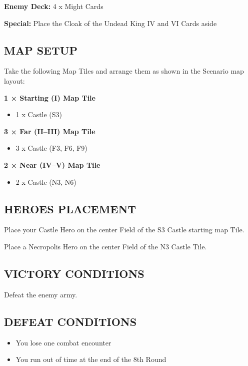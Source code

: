 \begin{multicols*}{2}
\textbf{Enemy Deck:} 4 x Might Cards

\textbf{Special:} Place the Cloak of the Undead King IV and VI Cards aside

\subsection*{\MakeUppercase{Map setup}}

Take the following Map Tiles and arrange them as shown in the Scenario map layout:

\textbf{1 × Starting (I) Map Tile}
\begin{itemize}
    \item 1 x Castle (S3)
\end{itemize}

\textbf{3 × Far (II--III) Map Tile}
\begin{itemize}
    \item 3 x Castle (F3, F6, F9)
\end{itemize}

\textbf{2 × Near (IV--V) Map Tile}
\begin{itemize}
    \item 2 x Castle (N3, N6)
\end{itemize}

\subsection*{\MakeUppercase{Heroes placement}}

Place your Castle Hero on the center Field of the S3 Castle starting map Tile.

Place a Necropolis Hero on the center Field of the N3 Castle Tile.

\subsection*{\MakeUppercase{Victory Conditions}}

Defeat the enemy army.

\subsection*{\MakeUppercase{Defeat Conditions}}
\begin{itemize}
  \item You lose one combat encounter
  \item You run out of time at the end of the 8th Round
\end{itemize}
\end{multicols*}

